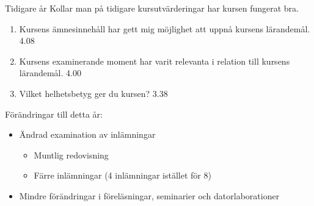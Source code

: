\documentclass[
  10pt,
  ignorenonframetext,
]{beamer}
\providecommand{\tightlist}{%
  \setlength{\itemsep}{0pt}\setlength{\parskip}{0pt}}
\begin{document}
\begin{frame}{Tidigare år}
\protect\hypertarget{tidigare-uxe5r}{}
Kollar man på tidigare kursutvärderingar har kursen fungerat bra.

\begin{enumerate}
\tightlist
\item
  Kursens ämnesinnehåll har gett mig möjlighet att uppnå kursens
  lärandemål. 4.08
\item
  Kursens examinerande moment har varit relevanta i relation till
  kursens lärandemål. 4.00
\item
  Vilket helhetsbetyg ger du kursen? 3.38
\end{enumerate}

\begin{block}{Förändringar till detta år:}
\protect\hypertarget{fuxf6ruxe4ndringar-till-detta-uxe5r}{}
\begin{itemize}
\tightlist
\item
  Ändrad examination av inlämningar

  \begin{itemize}
  \tightlist
  \item
    Muntlig redovisning
  \item
    Färre inlämningar (4 inlämningar istället för 8)
  \end{itemize}
\item
  Mindre förändringar i föreläsningar, seminarier och datorlaborationer
\end{itemize}
\end{block}
\end{frame}
\end{document}
